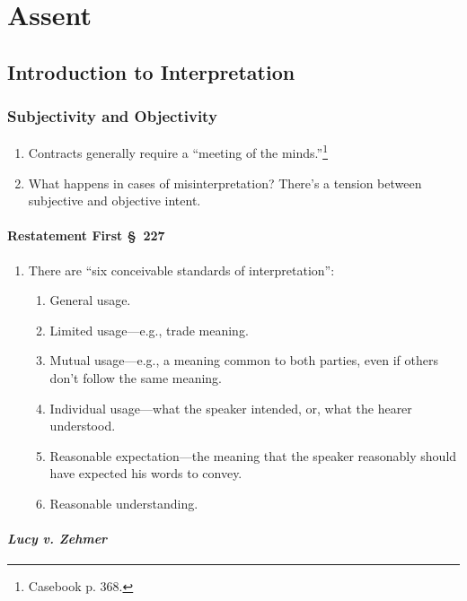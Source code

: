 \section{Assent}

\subsection{Introduction to Interpretation}

\subsubsection{Subjectivity and Objectivity}

\begin{enumerate}
    \item Contracts generally require a ``meeting of the 
    minds.''\footnote{Casebook p. 368.}
    \item What happens in cases of misinterpretation? There's a tension 
    between subjective and objective intent.
\end{enumerate}

\paragraph{Restatement First \S\ 227}

\begin{enumerate}
    \item There are ``six conceivable standards of interpretation'':
    \begin{enumerate}
        \item General usage.
        \item Limited usage---e.g., trade meaning.
        \item Mutual usage---e.g., a meaning common to both parties, even 
        if others don't follow the same meaning.
        \item Individual usage---what the speaker intended, or, what the 
        hearer understood.
        \item Reasonable expectation---the meaning that the speaker reasonably 
        should have expected his words to convey.
        \item Reasonable understanding.
    \end{enumerate}
\end{enumerate}

\paragraph{\emph{Lucy v. Zehmer}}


